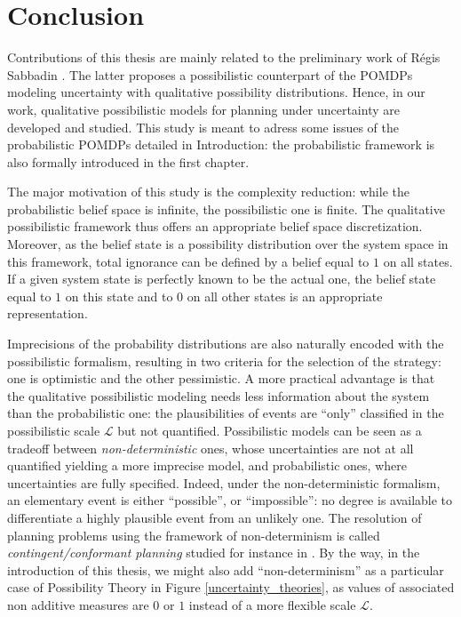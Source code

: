 \chapter*{Conclusion}
Contributions of this thesis are
mainly related to the preliminary work 
of R\'egis Sabbadin \cite{Sabbadin:1999:pipomdp}.
The latter proposes 
a possibilistic counterpart 
of the POMDPs 
modeling uncertainty 
with qualitative possibility distributions.
Hence, in our work, 
qualitative possibilistic models 
for planning under uncertainty
are developed and studied. 
This study is meant to adress some issues 
of the probabilistic POMDPs 
detailed in Introduction: 
the probabilistic framework is also 
formally introduced 
in the first chapter.

The major motivation of this study 
is the complexity reduction: 
while the probabilistic belief space is infinite,
the possibilistic one is finite.
The qualitative possibilistic framework 
thus offers an appropriate 
belief space discretization.
Moreover, as the belief state 
is a possibility distribution 
over the system space in this framework, 
total ignorance can be defined 
by a belief equal to $1$ on all states.
If a given system state is perfectly known
to be the actual one, 
the belief state equal to $1$ on this state 
and to $0$ on all other states 
is an appropriate representation.

Imprecisions of the probability distributions
are also naturally encoded 
with the possibilistic formalism, 
resulting in two criteria
for the selection of the strategy:
one is optimistic 
and the other pessimistic.
A more practical advantage is that 
the qualitative possibilistic modeling 
needs less information about the system
than the probabilistic one:
the plausibilities of events 
are ``only'' classified 
in the possibilistic scale $\mathcal{L}$ 
but not quantified.
Possibilistic models can be seen 
as a tradeoff between \textit{non-deterministic} ones, 
whose uncertainties are not at all quantified 
yielding a more imprecise model, 
and probabilistic ones, 
where uncertainties are fully specified.
Indeed, under the non-deterministic formalism,
an elementary event is either ``possible'',
or ``impossible'':
no degree is available
to differentiate a highly plausible event 
from an unlikely one.
The resolution of planning problems 
using the framework of non-determinism 
is called \textit{contingent/conformant planning} 
studied for instance in \cite{Albore_atranslation-based,bonet2014flexible}.
By the way, in the introduction of this thesis,
we might also add ``non-determinism''
as a particular case of Possibility Theory
in Figure \ref{uncertainty_theories},
as values of associated non additive measures
are $0$ or $1$ instead of a more flexible scale $\mathcal{L}$.

